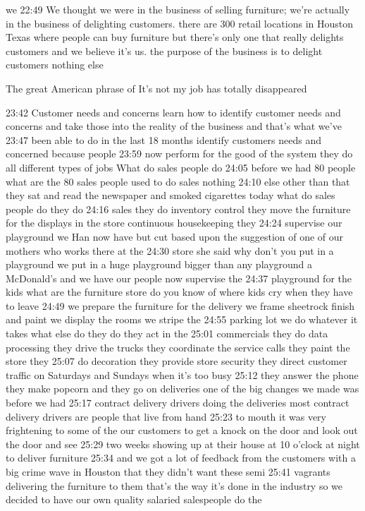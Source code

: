 \documentclass[
]{book}
\begin{document}
we
22:49 We thought we were in the business of selling furniture; we're actually in the business of delighting customers. there are 300 retail locations in Houston Texas where people can buy furniture but there's only one that really delights customers and we believe it's us. the purpose of the business is to delight customers nothing else

The great American phrase of It's not my job has totally disappeared

23:42 Customer needs and concerns
learn how to identify customer needs and concerns and take those into the reality of the business and that's what we've
23:47
been able to do in the last 18 months identify customers needs and concerned because people
23:59
now perform for the good of the system they do all different types of jobs
What do sales people do
24:05
before we had 80 people what are the 80 sales people used to do sales nothing
24:10
else other than that they sat and read the newspaper and smoked cigarettes today what do sales people do they do
24:16
sales they do inventory control they move the furniture for the displays in the store continuous housekeeping they
24:24
supervise our playground we Han now have but cut based upon the suggestion of one of our mothers who works there at the
24:30
store she said why don't you put in a playground we put in a huge playground bigger than any playground a McDonald's and we have our people now supervise the
24:37
playground for the kids what are the furniture store do you know of where kids cry when they have to leave
24:49
we prepare the furniture for the delivery we frame sheetrock finish and paint we display the rooms we stripe the
24:55
parking lot we do whatever it takes what else do they do they act in the
25:01
commercials they do data processing they drive the trucks they coordinate the service calls they paint the store they
25:07
do decoration they provide store security they direct customer traffic on Saturdays and Sundays when it's too busy
25:12
they answer the phone they make popcorn and they go on deliveries one of the big changes we made was before we had
25:17
contract delivery drivers doing the deliveries most contract delivery drivers are people that live from hand
25:23
to mouth it was very frightening to some of the our customers to get a knock on the door and look out the door and see
25:29
two weeks showing up at their house at 10 o'clock at night to deliver furniture
25:34
and we got a lot of feedback from the customers with a big crime wave in Houston that they didn't want these semi
25:41
vagrants delivering the furniture to them that's the way it's done in the industry so we decided to have our own quality salaried salespeople do the
\end{document}
